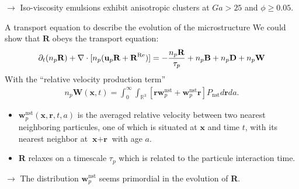 \documentclass{sintefbeamer}
\begin{document}
\begin{frame}
$\to$ Iso-viscosity emulsions exhibit anisotropic clusters at $Ga > 25$ and $\phi \ge 0.05$.  

\end{frame}

\begin{frame}
  {A transport equation to describe the evolution of the microstructure}
  We could show that $\textbf{R}$ obeys the transport equation: 
\begin{equation*}
    \partial_t (n_p\textbf{R})
    + \mathbf{\nabla}\cdot [
      n_p(\textbf{u}_p\textbf{R}
    + \textbf{R}^\text{Re})]
    = 
    - \frac{n_p\textbf{R}}{\tau_p}
    +n_p\textbf{B}
    + n_p\textbf{D}
    + n_p\textbf{W}
\end{equation*}
With the ``relative velocity production term''
\begin{align*}
    n_p \textbf{W}(\textbf{x},t) = 
    \int_{0}^\infty
    \int_{\mathbb{R}^3} \left[
        \textbf{r} \textbf{w}^\text{nst}_p
        + \textbf{w}^\text{nst}_p\textbf{r}
    \right]P_\text{nst}
    d\textbf{r}
    da.
\end{align*} 

\begin{itemize}
  \item  $\textbf{w}^\text{nst}_p(\textbf{x},\textbf{r},t,a)$ is the averaged relative velocity between two nearest neighboring particules, one of which is situated at $\textbf{x}$ and time $t$, with its nearest neighbor at $\textbf{x}+\textbf{r}$ with age $a$. 
  \item \textbf{R} relaxes on a timescale $\tau_p$ which is related to the particule interaction time.
\end{itemize}

$\to$ The distribution $\textbf{w}^\text{nst}_p$ seems primordial in the evolution of \textbf{R}. 

\end{frame}
\end{document}
